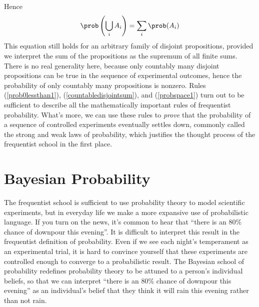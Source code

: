 %
Hence
%
\begin{equation}\label{countabledisjointsum} \prob \left(\bigcup_i A_i \right) = \sum_i \prob(A_i) \end{equation}
%
This equation still holds for an arbitrary family of disjoint propositions, provided we interpret the sum of the propositions as the supremum of all finite sums. There is no real generality here, because only countably many disjoint propositions can be true in the sequence of experimental outcomes, hence the probability of only countably many propositions is nonzero. Rules (\ref{prob0lessthan1}), (\ref{countabledisjointsum}), and (\ref{probspace1}) turn out to be sufficient to describe all the mathematically important rules of frequentist probability. What's more, we can use these rules to {\it prove} that the probability of a sequence of controlled experiments eventually settles down, commonly called the strong and weak laws of probability, which justifies the thought process of the frequentist school in the first place.

\section{Bayesian Probability}

The frequentist school is sufficient to use probability theory to model scientific experiments, but in everyday life we make a more expansive use of probabilistic language. If you turn on the news, it's common to hear that ``there is an 80\% chance of downpour this evening''. It is difficult to interpret this result in the frequentist definition of probability. Even if we see each night's temperament as an experimental trial, it is hard to convince yourself that these experiments are controlled enough to converge to a probabilistic result. The Bayesian school of probability redefines probability theory to be attuned to a person's individual beliefs, so that we can interpret ``there is an 80\% chance of downpour this evening'' as an individual's belief that they think it will rain this evening rather than not rain.


